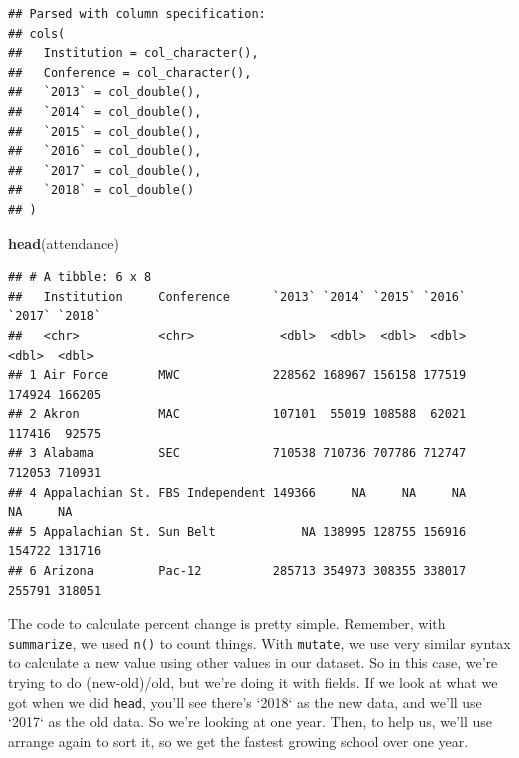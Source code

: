 \documentclass[]{book}
\newenvironment{Shaded}{\begin{snugshade}}{\end{snugshade}}
\newcommand{\KeywordTok}[1]{\textcolor[rgb]{0.13,0.29,0.53}{\textbf{#1}}}
\newcommand{\DataTypeTok}[1]{\textcolor[rgb]{0.13,0.29,0.53}{#1}}
\newcommand{\StringTok}[1]{\textcolor[rgb]{0.31,0.60,0.02}{#1}}
\newcommand{\OperatorTok}[1]{\textcolor[rgb]{0.81,0.36,0.00}{\textbf{#1}}}
\newcommand{\NormalTok}[1]{#1}
\begin{document}
\begin{verbatim}
## Parsed with column specification:
## cols(
##   Institution = col_character(),
##   Conference = col_character(),
##   `2013` = col_double(),
##   `2014` = col_double(),
##   `2015` = col_double(),
##   `2016` = col_double(),
##   `2017` = col_double(),
##   `2018` = col_double()
## )
\end{verbatim}

\begin{Shaded}
\begin{Highlighting}[]
\KeywordTok{head}\NormalTok{(attendance)}
\end{Highlighting}
\end{Shaded}

\begin{verbatim}
## # A tibble: 6 x 8
##   Institution     Conference      `2013` `2014` `2015` `2016` `2017` `2018`
##   <chr>           <chr>            <dbl>  <dbl>  <dbl>  <dbl>  <dbl>  <dbl>
## 1 Air Force       MWC             228562 168967 156158 177519 174924 166205
## 2 Akron           MAC             107101  55019 108588  62021 117416  92575
## 3 Alabama         SEC             710538 710736 707786 712747 712053 710931
## 4 Appalachian St. FBS Independent 149366     NA     NA     NA     NA     NA
## 5 Appalachian St. Sun Belt            NA 138995 128755 156916 154722 131716
## 6 Arizona         Pac-12          285713 354973 308355 338017 255791 318051
\end{verbatim}

The code to calculate percent change is pretty simple. Remember, with
\texttt{summarize}, we used \texttt{n()} to count things. With
\texttt{mutate}, we use very similar syntax to calculate a new value
using other values in our dataset. So in this case, we're trying to do
(new-old)/old, but we're doing it with fields. If we look at what we got
when we did \texttt{head}, you'll see there's `2018` as the new data,
and we'll use `2017` as the old data. So we're looking at one year.
Then, to help us, we'll use arrange again to sort it, so we get the
fastest growing school over one year.

\begin{Shaded}
\end{Shaded}
\end{document}
